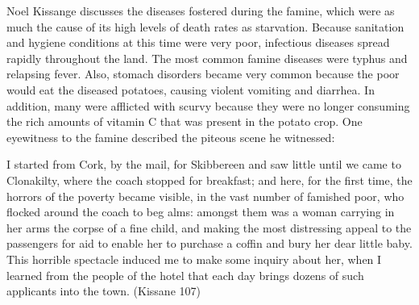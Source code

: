 \begin{Spacing}{1.5}

\hspace{.4in}Noel Kissange discusses the diseases fostered during the famine, which were as much the cause of its high levels of death rates as starvation. Because sanitation and hygiene conditions at this time were very poor, infectious diseases spread rapidly throughout the land. The most common famine diseases were typhus and relapsing fever. Also, stomach disorders became very common because the poor would eat the diseased potatoes, causing violent vomiting and diarrhea. In addition, many were afflicted with scurvy because they were no longer consuming the rich amounts of vitamin C that was present in the potato crop. One eyewitness to the famine described the piteous scene he witnessed:


I started from Cork, by the mail, for Skibbereen and saw little until we came to Clonakilty, where the coach stopped for breakfast; and here, for the first time, the horrors of the poverty became visible, in the vast number of famished poor, who flocked around the coach to beg alms: amongst them was a woman carrying in her arms the corpse of a fine child, and making the most distressing appeal to the passengers for aid to enable her to purchase a coffin and bury her dear little baby. This horrible spectacle induced me to make some inquiry about her, when I learned from the people of the hotel that each day brings dozens of such applicants into the town. (Kissane 107)



\end{Spacing}
